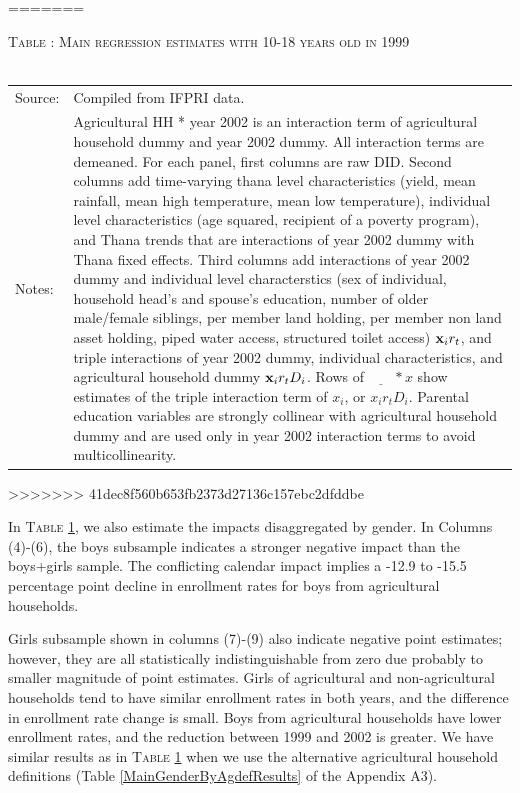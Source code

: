 \documentclass[12pt,letterpaper]{article}
\newcommand{\bfx}{\ensuremath{\mbox{\bf x}}}
\newcommand{\0}{\ensuremath{\mbox{\boldmath $0$}}}
\begin{document}
=======
\begin{table}\hfil\textsc{\footnotesize Table \thetable: Main regression estimates with 10-18 years old in 1999\label{base10}}\\\setlength{\tabcolsep}{.5pt}\renewcommand{\arraystretch}{.675}\hspace{-2em}\hfil\\\renewcommand{\arraystretch}{1}\hfil\begin{tabular}{>{\hfill\scriptsize}p{1cm}<{}>{\scriptsize}p{12cm}<{\hfill}} Source:& Compiled from IFPRI data. \\[-1ex] Notes:&   \textsf{Agricultural HH * year 2002} is an interaction term of agricultural household dummy and year 2002 dummy. All interaction terms are demeaned. For each panel, first columns are raw DID. Second columns add time-varying thana level characteristics (yield, mean rainfall, mean high temperature, mean low temperature), individual level characteristics (age squared, recipient of a poverty program), and \textsf{Thana trends} that are interactions of year 2002 dummy with Thana fixed effects. Third columns add interactions of year 2002 dummy and individual level characterstics (sex of individual, household head's and spouse's education, number of older male/female siblings, per member land holding, per member non land asset holding, piped water access, structured toilet access) $\bfx_{i}r_{t}$, and triple interactions of year 2002 dummy, individual characteristics, and agricultural household dummy $\bfx_{i}r_{t}D_{i}$. Rows of $\underline{\phantom{mm}}*x$ show estimates of the triple interaction term of $x_{i}$, or $x_{i}r_{t}D_{i}$. Parental education variables are strongly collinear with agricultural household dummy and are used only in year 2002 interaction terms to avoid multicollinearity.  \end{tabular} \end{table}
>>>>>>> 41dec8f560b653fb2373d27136c157ebc2dfddbe


In \textsc{\small Table \ref{base10}}, we also estimate the impacts disaggregated by gender. In Columns (4)-(6), the boys subsample indicates a stronger negative impact than the boys+girls sample. The conflicting calendar impact implies a -12.9 to -15.5 percentage point decline in enrollment rates for boys from agricultural households. 

Girls subsample shown in columns (7)-(9) also indicate negative point estimates; however, they are all statistically indistinguishable from zero due probably to smaller magnitude of point estimates. Girls of agricultural and non-agricultural households tend to have similar enrollment rates in both years, and the difference in enrollment rate change is small. Boys from agricultural households have lower enrollment rates, and the reduction between 1999 and 2002 is greater. We have similar results as in \textsc{\small Table \ref{base10}} when we use the alternative agricultural household definitions (\textsf{\small Table \ref{MainGenderByAgdefResults}} of the Appendix A3). 
\end{document}
